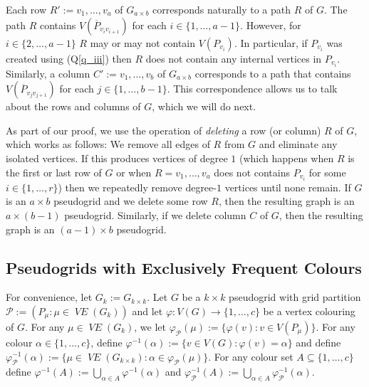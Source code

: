 \documentclass{patmorin}
\newcommand{\defin}[1]{\emph{\color{brown}#1}}
\DeclareMathOperator{\VE}{\mathit{VE}}
\begin{document}

Each row $R':=v_1,\ldots,v_a$ of $G_{a\times b}$ corresponds naturally to a path $R$ of $G$. The path $R$ contains $V(\overline{P}_{v_iv_{i+1}})$ for each $i\in\{1,\ldots,a-1\}$.  However, for $i\in\{2,\ldots,a-1\}$ $R$ may or may not contain $V(P_{v_i})$.  In particular, if $P_{v_i}$ was created using (Q\ref{q_iii}) then $R$ does not contain any internal vertices in $P_{v_i}$.
Similarly, a column $C':=v_1,\ldots,v_b$ of $G_{a\times b}$ corresponds to a path that contains $V(\overline{P}_{v_jv_{j+1}})$ for each $j\in\{1,\ldots,b-1\}$. This correspondence allows us to talk about the rows and columns of $G$, which we will do next.

As part of our proof, we use the operation of \defin{deleting} a row (or column) $R$ of $G$, which works as follows:  We remove all edges of $R$ from $G$ and eliminate any isolated vertices.  If this produces vertices of degree $1$ (which happens when $R$ is the first or last row of $G$ or when $R=v_1,\ldots,v_a$ does not contains $P_{v_i}$ for some $i\in\{1,\ldots,r\}$) then we repeatedly remove degree-$1$ vertices until none remain.  If $G$ is an $a\times b$ pseudogrid and we delete some row $R$, then the resulting graph is an $a\times (b-1)$ pseudogrid.  Similarly, if we delete column $C$ of $G$, then the resulting graph is an $(a-1)\times b$ pseudogrid.


\subsection{Pseudogrids with Exclusively Frequent Colours}

For convenience, let $G_k:=G_{k\times k}$.
Let $G$ be a $k\times k$ pseudogrid with grid partition $\mathcal{P}:=(P_\mu:\mu\in\VE(G_{k}))$ and let $\varphi:V(G)\to\{1,\ldots,c\}$ be a vertex colouring of $G$.  For any $\mu\in\VE(G_{k})$, we let $\varphi_{\mathcal{P}}(\mu):=\{\varphi(v):v\in V(P_\mu)\}$.  For any colour $\alpha\in\{1,\ldots,c\}$, define $\varphi^{-1}(\alpha):=\{v\in V(G):\varphi(v)=\alpha\}$ and define $\varphi_\mathcal{P}^{-1}(\alpha):=\{\mu\in \VE(G_{k\times k}):\alpha\in\varphi_\mathcal{P}(\mu)\}$.  For any colour set $A\subseteq\{1,\ldots,c\}$ define $\varphi^{-1}(A):=\bigcup_{\alpha\in A}\varphi^{-1}(\alpha)$ and $\varphi_\mathcal{P}^{-1}(A):=\bigcup_{\alpha\in A}\varphi_{\mathcal{P}}^{-1}(\alpha)$.
\end{document}
